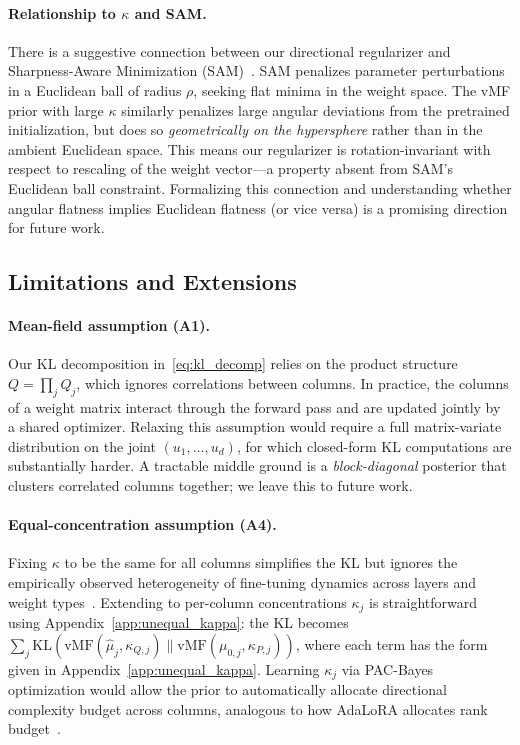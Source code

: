 \documentclass[11pt]{article}
\newcommand{\KL}{\mathrm{KL}}
\newcommand{\vMF}{\mathrm{vMF}}
\begin{document}
\paragraph{Relationship to $\kappa$ and SAM.}
There is a suggestive connection between our directional regularizer and
Sharpness-Aware Minimization (SAM)~\cite{bahri2022sharpness,foret2021sam}.
SAM penalizes parameter perturbations in a Euclidean ball of radius $\rho$,
seeking flat minima in the weight space.
The vMF prior with large $\kappa$ similarly penalizes large angular
deviations from the pretrained initialization, but does so
\emph{geometrically on the hypersphere} rather than in the ambient
Euclidean space.
This means our regularizer is rotation-invariant with respect to
rescaling of the weight vector---a property absent from SAM's Euclidean
ball constraint.
Formalizing this connection and understanding whether angular flatness
implies Euclidean flatness (or vice versa) is a promising direction for
future work.

\subsection{Limitations and Extensions}
\label{sec:disc_limitations}

\paragraph{Mean-field assumption (A1).}
Our KL decomposition in~\eqref{eq:kl_decomp} relies on the product
structure $Q = \prod_j Q_j$, which ignores correlations between columns.
In practice, the columns of a weight matrix interact through the forward
pass and are updated jointly by a shared optimizer.
Relaxing this assumption would require a full matrix-variate distribution
on the joint $(u_1, \ldots, u_d)$, for which closed-form KL computations
are substantially harder.
A tractable middle ground is a \emph{block-diagonal} posterior that
clusters correlated columns together; we leave this to future work.

\paragraph{Equal-concentration assumption (A4).}
Fixing $\kappa$ to be the same for all columns simplifies the KL but
ignores the empirically observed heterogeneity of fine-tuning dynamics
across layers and weight types~\cite{zhang2023adalora}.
Extending to per-column concentrations $\kappa_j$ is straightforward
using Appendix~\ref{app:unequal_kappa}: the KL becomes
$\sum_j \KL(\vMF(\hat{\mu}_j, \kappa_{Q,j}) \| \vMF(\mu_{0,j},
\kappa_{P,j}))$, where each term has the form given in
Appendix~\ref{app:unequal_kappa}.
Learning $\kappa_j$ via PAC-Bayes optimization would allow the prior
to automatically allocate directional complexity budget across columns,
analogous to how AdaLoRA allocates rank budget~\cite{zhang2023adalora}.
\end{document}
